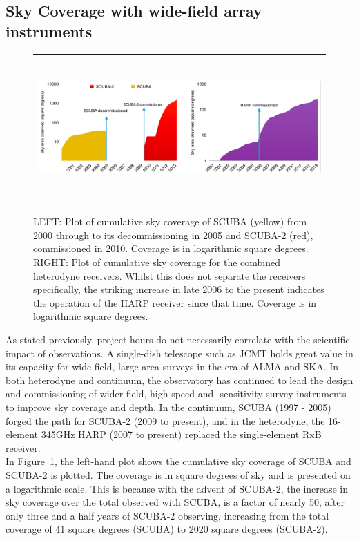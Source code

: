 \documentclass[]{spie}  %
\begin{document}
\subsection{Sky Coverage with wide-field array instruments}
\begin{figure}[h]
   \begin{center}
   \begin{tabular}{c}
   \includegraphics[height=5.5cm]{jcmt_cumulativearea}
   \end{tabular}
   \end{center}
   \caption{\label{fig:sc2} LEFT: Plot of cumulative sky coverage of SCUBA (yellow) from 2000 through to its decommissioning in 2005 and SCUBA-2 (red), commissioned in 2010. Coverage is in logarithmic square degrees. RIGHT: Plot of cumulative sky coverage for the combined heterodyne receivers. Whilst this does not separate the receivers specifically, the striking increase in late 2006 to the present indicates the operation of the HARP receiver since that time. Coverage is in logarithmic square degrees.}
\end{figure}
As stated previously, project hours do not necessarily correlate with
the scientific impact of observations. A single-dish telescope such as
JCMT holds great value in its capacity for wide-field, large-area
surveys in the era of ALMA and SKA. In both heterodyne and continuum,
the observatory has continued to lead the design and commissioning of
wider-field, high-speed and -sensitivity survey instruments to improve
sky coverage and depth. In the continuum, SCUBA (1997 - 2005) forged
the path for SCUBA-2 (2009 to present), and in the heterodyne, the
16-element 345GHz HARP (2007 to present) replaced the single-element
RxB receiver.\cite{1998SPIE.3357..620C} \\ 

In Figure~\ref{fig:sc2}, the left-hand plot shows the cumulative sky coverage of
SCUBA and SCUBA-2 is plotted. The coverage is in square degrees of sky
and is presented on a logarithmic scale. This is because with the
advent of SCUBA-2, the increase in sky coverage over the total
observed with SCUBA, is a factor of nearly 50, after only three and a
half years of SCUBA-2 observing, increasing from the total coverage of
41 square degrees (SCUBA) to 2020 square degrees (SCUBA-2).\\
\end{document}
